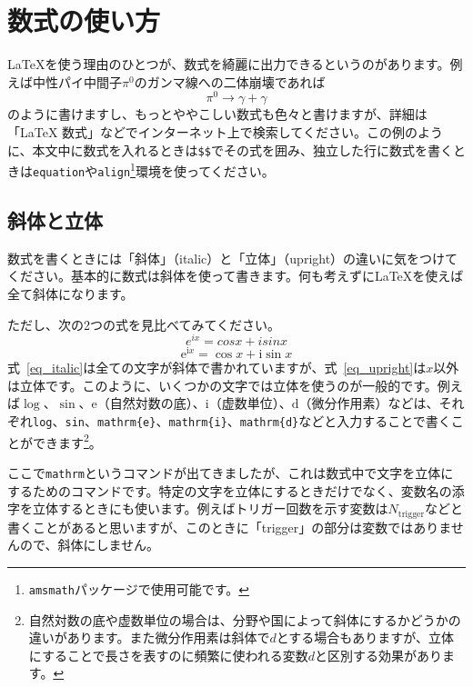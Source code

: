 \section{数式の使い方}

\LaTeX{}を使う理由のひとつが、数式を綺麗に出力できるというのがあります。例えば中性パイ中間子$\pi^0$のガンマ線への二体崩壊であれば
\begin{equation}
  \pi^0 \rightarrow \gamma + \gamma
\end{equation}
のように書けますし、もっとややこしい数式も色々と書けますが、詳細は「LaTeX 数式」などでインターネット上で検索してください。この例のように、本文中に数式を入れるときは\texttt{\$\$}でその式を囲み、独立した行に数式を書くときは\texttt{equation}や\texttt{align}\footnote{\texttt{amsmath}パッケージで使用可能です。}環境を使ってください。

\subsection{斜体と立体}
数式を書くときには「斜体」（italic）と「立体」（upright）の違いに気をつけてください。基本的に数式は斜体を使って書きます。何も考えずに\LaTeX{}を使えば全て斜体になります。

ただし、次の2つの式を見比べてみてください。
\begin{equation}
  e^{ix}=cosx + isinx
  \label{eq_italic}
\end{equation}
\begin{equation}
  \mathrm{e}^{\mathrm{i}x}=\cos x + \mathrm{i}\sin x
  \label{eq_upright}
\end{equation}
式~\ref{eq_italic}は全ての文字が斜体で書かれていますが、式~\ref{eq_upright}は$x$以外は立体です。このように、いくつかの文字では立体を使うのが一般的です。例えば$\log$、$\sin$、$\mathrm{e}$（自然対数の底）、$\mathrm{i}$（虚数単位）、$\mathrm{d}$（微分作用素）などは、それぞれ\texttt{\bs{}log}、\texttt{\bs{}sin}、\texttt{\bs{}mathrm\{e\}}、\texttt{\bs{}mathrm\{i\}}、\texttt{\bs{}mathrm\{d\}}などと入力することで書くことができます\footnote{自然対数の底や虚数単位の場合は、分野や国によって斜体にするかどうかの違いがあります。また微分作用素は斜体で$d$とする場合もありますが、立体にすることで長さを表すのに頻繁に使われる変数$d$と区別する効果があります。}。

ここで\texttt{\bs{}mathrm}というコマンドが出てきましたが、これは数式中で文字を立体にするためのコマンドです。特定の文字を立体にするときだけでなく、変数名の添字を立体するときにも使います。例えばトリガー回数を示す変数は$N_\mathrm{trigger}$などと書くことがあると思いますが、このときに「trigger」の部分は変数ではありませんので、斜体にしません。


